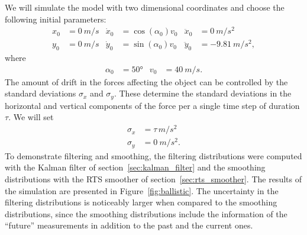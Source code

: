 \begin{example}
We will simulate the model with two dimensional coordinates
and choose the following initial parameters:
\begin{align}
	x_0 &= \SI{0}{m/s} & \dot{x}_0&=\cos(\alpha_0)v_0 & \ddot{x}_0&=\SI{0}{m/s^2}\\
	y_0 &= \SI{0}{m/s} & \dot{y}_0&=\sin(\alpha_0)v_0 & \ddot{y}_0&=\SI{-9.81}{m/s^2},
\end{align}
where
\begin{align}
	\alpha_0 &= \ang{50} & v_0&=\SI{40}{m/s}.
\end{align}
 The amount of drift in the forces affecting the object can be
 controlled by the standard deviations $\sigma_x$ and $\sigma_y$.
These determine the standard deviations in the horizontal and vertical
components of the force per a single time step of duration $\tau$.
We will set 
\begin{align}
	\sigma_x&=\tau\,\si{m/s^2}\\
	\sigma_y&=\SI{0}{m/s^2}.
\end{align} 
To demonstrate filtering and smoothing, the filtering distributions were
computed with the Kalman filter of section~\ref{sec:kalman_filter} and the smoothing distributions with
the RTS smoother of section~\ref{sec:rts_smoother}. The results of the simulation are presented in
Figure~\ref{fig:ballistic}. The uncertainty in the filtering distributions is noticeably larger
when compared to the smoothing distributions, since the smoothing distributions
include the information of the ``future'' measurements in addition to the past and the current ones.
\end{example}

